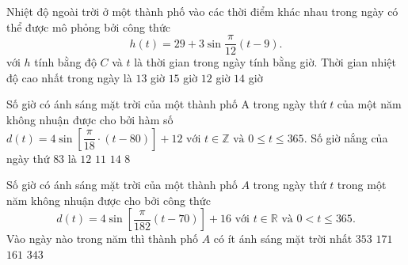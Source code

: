 \begin{ex}%
	Nhiệt độ ngoài trời ở một thành phố vào các thời điểm khác nhau trong ngày có thể được mô phỏng bởi công thức	$$h(t)=29+ 3\sin\dfrac{\pi}{12}\left( t-9\right).$$ với $h$ tính bằng độ $C$ và $t$ là thời gian trong ngày tính bằng giờ. Thời gian nhiệt độ cao nhất trong ngày là
	\choice
	{$ 13 $ giờ}
	{\True $ 15 $ giờ}
	{$ 12 $ giờ}
	{$ 14 $ giờ}
\end{ex}

\begin{ex}%
	Số giờ có ánh sáng mặt trời của một thành phố A trong ngày thứ $t$ của một năm không nhuận được cho bởi hàm số
	$d(t) = 4\sin \left[ \dfrac{\pi}{18} \cdot (t - 80)\right]  + 12 \text{ với }t\in \mathbb{Z} \text{ và } 0 \le t \le 365$. Số giờ nắng của ngày thứ $ 83 $ là
	\choice
	{$ 12 $}
	{$ 11 $}
	{\True $ 14 $}
	{$8 $}
\end{ex}

\begin{ex}%
	Số giờ có ánh sáng mặt trời của một thành phố $A$ trong ngày thứ $t$ trong một năm không nhuận được cho bởi công thức $$d(t) = 4\sin \left[\dfrac{\pi}{182}\left(t - 70\right) \right] + 16 \text{ với } t \in \mathbb{R} \text{ và } 0 < t \le 365.$$ Vào ngày nào trong năm thì thành phố $A$ có ít ánh sáng mặt trời nhất
	\choice
	{$353$}
	{$171$}
	{$161$}
	{\True $343$}
\end{ex}

